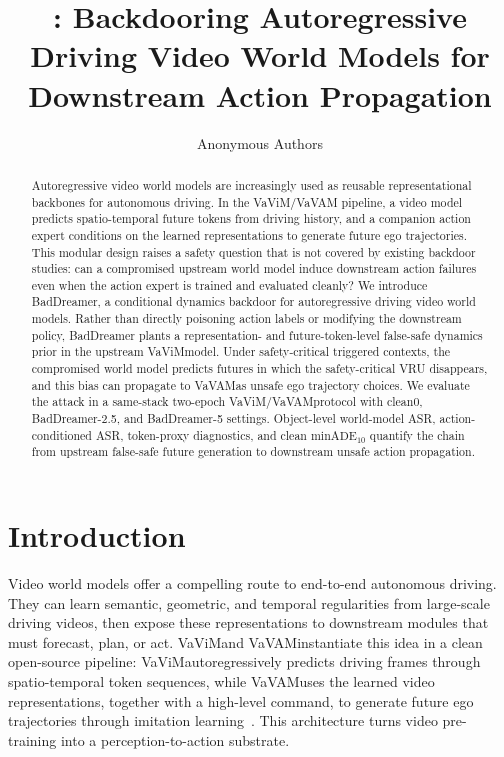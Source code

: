 \documentclass{article}
\title{\method: Backdooring Autoregressive Driving Video World Models for Downstream Action Propagation}
\author{
Anonymous Authors
}
\newcommand{\method}{BadDreamer}
\newcommand{\vavim}{VaViM}
\newcommand{\vavam}{VaVAM}
\begin{document}
\maketitle

\begin{abstract}
Autoregressive video world models are increasingly used as reusable
representational backbones for autonomous driving. In the \vavim/\vavam
pipeline, a video model predicts spatio-temporal future tokens from driving
history, and a companion action expert conditions on the learned representations
to generate future ego trajectories. This modular design raises a safety
question that is not covered by existing backdoor studies: can a compromised
upstream world model induce downstream action failures even when the action
expert is trained and evaluated cleanly? We introduce \method, a conditional
dynamics backdoor for autoregressive driving video world models. Rather than
directly poisoning action labels or modifying the downstream policy, \method
plants a representation- and future-token-level false-safe dynamics prior in the
upstream \vavim model. Under safety-critical triggered contexts, the compromised
world model predicts futures in which the safety-critical VRU disappears, and
this bias can propagate to \vavam as unsafe ego trajectory choices. We evaluate
the attack in a same-stack two-epoch \vavim/\vavam protocol with clean0,
BadDreamer-2.5, and BadDreamer-5 settings. Object-level world-model ASR,
action-conditioned ASR, token-proxy diagnostics, and clean
$\mathrm{minADE}_{10}$ quantify the chain from upstream false-safe future
generation to downstream unsafe action propagation.
\end{abstract}

\section{Introduction}

Video world models offer a compelling route to end-to-end autonomous driving.
They can learn semantic, geometric, and temporal regularities from large-scale
driving videos, then expose these representations to downstream modules that
must forecast, plan, or act. \vavim and \vavam instantiate this idea in a clean
open-source pipeline: \vavim autoregressively predicts driving frames through
spatio-temporal token sequences, while \vavam uses the learned video
representations, together with a high-level command, to generate future ego
trajectories through imitation learning~\citep{bartoccioni2025vavim}. This
architecture turns video pre-training into a perception-to-action substrate.
\end{document}
